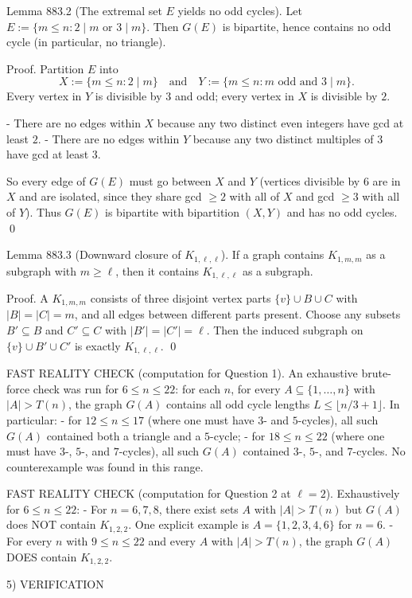 Lemma 883.2 (The extremal set $E$ yields no odd cycles).
Let $E:=\{m\le n:2\mid m\text{ or }3\mid m\}$. Then $G(E)$ is bipartite, hence contains no odd cycle (in particular, no triangle).

Proof.
Partition $E$ into
\[X:=\{m\le n:2\mid m\}\quad\text{and}\quad Y:=\{m\le n: m\text{ odd and }3\mid m\}.
\]
Every vertex in $Y$ is divisible by $3$ and odd; every vertex in $X$ is divisible by $2$.

- There are no edges within $X$ because any two distinct even integers have gcd at least $2$.
- There are no edges within $Y$ because any two distinct multiples of $3$ have gcd at least $3$.

So every edge of $G(E)$ must go between $X$ and $Y$ (vertices divisible by $6$ are in $X$ and are isolated, since they share gcd $\ge2$ with all of $X$ and gcd $\ge3$ with all of $Y$).
Thus $G(E)$ is bipartite with bipartition $(X,Y)$ and has no odd cycles. \qed

Lemma 883.3 (Downward closure of $K_{1,\ell,\ell}$).
If a graph contains $K_{1,m,m}$ as a subgraph with $m\ge \ell$, then it contains $K_{1,\ell,\ell}$ as a subgraph.

Proof.
A $K_{1,m,m}$ consists of three disjoint vertex parts $\{v\}\cup B\cup C$ with $|B|=|C|=m$, and all edges between different parts present.
Choose any subsets $B'\subseteq B$ and $C'\subseteq C$ with $|B'|=|C'|=\ell$.
Then the induced subgraph on $\{v\}\cup B'\cup C'$ is exactly $K_{1,\ell,\ell}$. \qed

FAST REALITY CHECK (computation for Question 1).
An exhaustive brute-force check was run for $6\le n\le 22$:
for each $n$, for every $A\subseteq\{1,\dots,n\}$ with $|A|>T(n)$, the graph $G(A)$ contains all odd cycle lengths $L\le \lfloor n/3+1\rfloor$.
In particular:
- for $12\le n\le 17$ (where one must have $3$- and $5$-cycles), all such $G(A)$ contained both a triangle and a $5$-cycle;
- for $18\le n\le 22$ (where one must have $3$-, $5$-, and $7$-cycles), all such $G(A)$ contained $3$-, $5$-, and $7$-cycles.
No counterexample was found in this range.

FAST REALITY CHECK (computation for Question 2 at $\ell=2$).
Exhaustively for $6\le n\le 22$:
- For $n=6,7,8$, there exist sets $A$ with $|A|>T(n)$ but $G(A)$ does NOT contain $K_{1,2,2}$. One explicit example is $A=\{1,2,3,4,6\}$ for $n=6$.
- For every $n$ with $9\le n\le 22$ and every $A$ with $|A|>T(n)$, the graph $G(A)$ DOES contain $K_{1,2,2}$.

5) VERIFICATION

